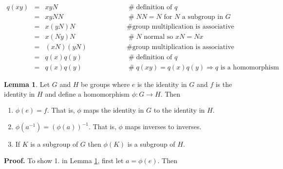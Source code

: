 \documentclass{article}
\theoremstyle{definition}
\newtheorem{lemma}{Lemma}[section]
\begin{document}
\begin{equation*}
\begin{array}{rcll}
q(xy) 
&=& xyN                 &\hspace{5em} \mathrel{\#} \text{definition of $q$} \\
[5pt]
&=& xyNN                &\hspace{5em} \mathrel{\#} NN =N \text{ for $N$ a subgroup in $G$} \\
[5pt]
&=& x (yN) N            &\hspace{5em} \mathrel{\#} \text{group multiplication is associative} \\
[5pt]
&=& x (Ny) N            &\hspace{5em} \mathrel{\#} \text{$N$ normal so  $xN = Nx$} \\
[5pt]
&=& (xN)(yN)            &\hspace{5em} \mathrel{\#} \text{group multiplication is associative} \\
[5pt]
&=& q(x) q(y)           &\hspace{5em} \mathrel{\#} \text{definition of $q$} \\
[5pt]
&=& q(x) q(y)			&\hspace{5em} \mathrel{\#} q(xy) = q(x) q(y) \Rightarrow \text{$q$ is a homomorphism} 
\end{array}
\end{equation*}


\bigskip
\begin{lemma}
Let $G$ and $H$ be groups where $e$ is the identity in $G$ and
$f$ is the identity in $H$ and define a homomorphism $\phi: G
\rightarrow H$. Then
\begin{enumerate}
\item $\phi(e) = f$. That is,  $\phi$ maps the identity in $G$ to
      the identity in $H$. \item $\phi(a^{-1}) = (\phi(a))^{-1}$. That is, 
      $\phi$ maps inverses to inverses.
\item If $K$ is a subgroup of $G$ then $\phi(K)$ is a subgroup of $H$.
\end{enumerate}
\label{lemma:homomorphism}
\end{lemma}

\bigskip
\noindent
\textbf{Proof.} To show 1. in Lemma \ref{lemma:homomorphism},
first let $a = \phi(e)$. Then
\end{document}
